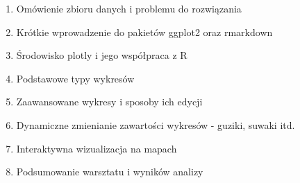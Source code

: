 \documentclass[\main/boa.tex]{subfiles}
\begin{document}
\planwarsztatu
\begin{enumerate}
\item Omówienie zbioru danych i problemu do rozwiązania
\item Krótkie wprowadzenie do pakietów ggplot2 oraz rmarkdown
\item Środowisko plotly i jego współpraca z R
\item Podstawowe typy wykresów
\item Zaawansowane wykresy i sposoby ich edycji
\item Dynamiczne zmienianie zawartości wykresów - guziki, suwaki itd.
\item Interaktywna wizualizacja na mapach
\item Podsumowanie warsztatu i wyników analizy
\end{enumerate}	 
\end{document}
